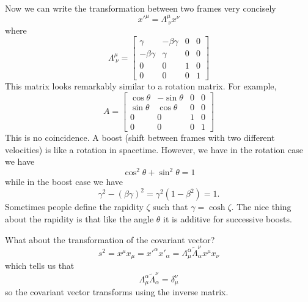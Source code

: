 Now we can write the transformation between two frames very concisely
\begin{equation}
x'^\mu = \Lambda^\mu_{~\nu} x^\nu
\label{eq:282}
\end{equation}
where
\begin{equation}
\Lambda^\mu_{~\nu} = \left [ 
\begin{array}{rrrr}
\gamma      & -\beta \gamma  & 0 & 0 \\
-\beta\gamma &         \gamma & 0 & 0 \\
          0 &             0  & 1 & 0 \\
          0 &             0  & 0 & 1 
\end{array}
\right ]
\label{eq:283}
\end{equation}
This matrix looks remarkably similar to a rotation matrix.  For
example,
\begin{equation}
A = \left [ 
\begin{array}{rrrr}
\cos \theta & -\sin\theta   & 0 & 0 \\
\sin\theta &  \cos\theta & 0 & 0 \\
          0 &             0  & 1 & 0 \\
          0 &             0  & 0 & 1 
\end{array}\right ] 
\label{eq:284}
\end{equation}
This is no coincidence.  A boost (shift between frames with two
different velocities) is like a rotation in spacetime.  However,
we have in the rotation case we have
\begin{equation}
\cos^2\theta + \sin^2\theta = 1
\label{eq:285}
\end{equation}
while in the boost case we have
\begin{equation}
\gamma^2 - (\beta\gamma)^2 = \gamma^2 ( 1 - \beta^2 ) = 1.
\label{eq:286}
\end{equation}
Sometimes people define the rapidity $\zeta$ such that $\gamma = \cosh
\zeta$.  The nice thing about the rapidity is that like the angle
$\theta$ it is additive for successive boosts.

What about the transformation of the covariant vector?
\begin{equation}
s^2 = x^\mu x_\mu = x'^\alpha x'_\alpha = \Lambda^\alpha_\mu 
{\tilde \Lambda}_\alpha^\nu  x^\mu x_\nu
\label{eq:287}
\end{equation}
which tells us that
\begin{equation}
\Lambda^\alpha_\mu 
{\tilde \Lambda}_\alpha^\nu  = \delta^\nu_\mu
\label{eq:288}
\end{equation}
so the covariant vector transforms using the inverse matrix.

